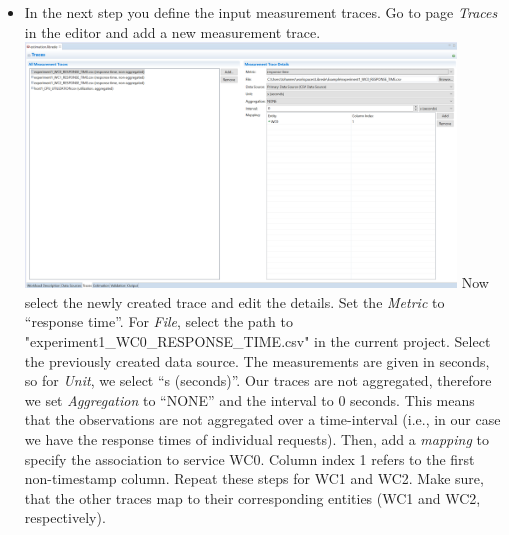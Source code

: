 \begin{itemize}
	\item In the next step you define the input measurement traces. Go to page \emph{Traces} in the editor and add a new measurement trace. \newline
			\newline
			\includegraphics[width=0.9\textwidth]{screenshots/Screenshot26}
			\newline
			Now select the newly created trace and edit the details. Set the \emph{Metric} to ``response time''. For \emph{File}, select the path to "experiment1\_WC0\_RESPONSE\_TIME.csv" in the current project. Select the previously created data source. The measurements are given in seconds, so for \emph{Unit}, we select ``s (seconds)''. Our traces are not aggregated, therefore we set \emph{Aggregation} to ``NONE'' and the interval to 0 seconds. This means that the observations are not aggregated over a time-interval (i.e., in our case we have the response times of individual requests). Then, add a \emph{mapping} to specify the association to service WC0. Column index 1 refers to the first non-timestamp column. Repeat these steps for WC1 and WC2. Make sure, that the other traces map to their corresponding entities (WC1 and WC2, respectively).
			

\end{itemize}
